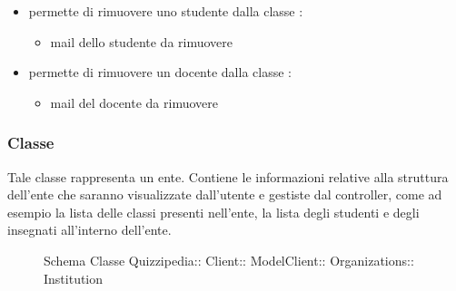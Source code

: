 \begin{itemize}
\newline
\item {}
\newline
permette di rimuovere uno studente dalla
classe
\newline
{} :
\begin{itemize}
\item {}
\newline
mail dello studente da rimuovere
\end{itemize}
\item {}
\newline
permette di rimuovere un docente dalla
classe
\newline
{} :
\begin{itemize}
\item {}
\newline
mail del docente da rimuovere
\end{itemize}
\end{itemize}
\subsubsection{Classe }
Tale classe rappresenta un ente. Contiene le informazioni relative alla struttura dell'ente che saranno visualizzate dall'utente e gestiste dal controller, come ad esempio la lista delle classi presenti nell'ente, la lista degli studenti e degli insegnati all'interno dell'ente.
\begin{figure}[H]
\centering
\noindent{}
\caption[Schema Classe Institution]{Schema Classe Quizzipedia:: Client:: ModelClient:: Organizations:: Institution}
\end{figure}
